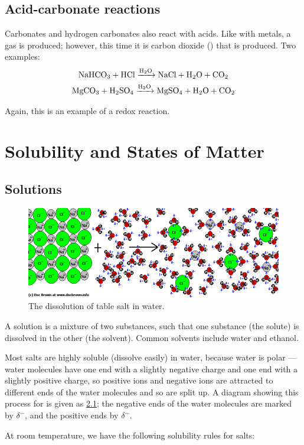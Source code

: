 \documentclass[a4paper]{memoir}
\begin{document}
\section{Acid-carbonate reactions}
Carbonates and hydrogen carbonates also react with acids. Like with metals, a gas is produced; however, this time it is carbon
dioxide () that is produced. Two examples:
\begin{gather}
  \ce{NaHCO3 + HCl ->[H2O] NaCl + H2O + CO2}\\
  \ce{MgCO3 + H2SO4 ->[H2O] MgSO4 + H2O + CO2}
\end{gather}

Again, this is an example of a redox reaction.


\chapter{Solubility and States of Matter}
\section{Solutions}
\begin{figure}
  \centering
  \includegraphics[width=\textwidth]{dissolving}
  \caption{The dissolution of table salt in water.\label{fig:dissolving}}
\end{figure}
A solution is a mixture of two substances, such that one substance (the solute) is dissolved in the other (the solvent). Common solvents
include water and ethanol.

Most salts are highly soluble (dissolve easily) in water, because water is polar --- water molecules have one end with a slightly negative charge
and one end with a slightly positive charge, so positive ions and negative ions are attracted to different ends of the water molecules and so are
split up. A diagram showing this process for  is given as \cref{fig:dissolving}; the negative ends of the water molecules are marked by $ \delta^- $,
and the positive ends by $ \delta^- $.

At room temperature, we have the following solubility rules for salts:
\end{document}
